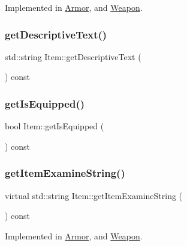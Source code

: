 Implemented in \mbox{\hyperlink{class_armor_a697e23862a5a6bb32fc5b1b143d61f58}{Armor}}, and \mbox{\hyperlink{class_weapon_af7fda0b6e0d4ce8f25e2b0e4ad5fd94d}{Weapon}}.

\mbox{\label{class_item_acc7555345dbfa5a079622fb3eec6f5b7}} 
\subsubsection{\texorpdfstring{get\+Descriptive\+Text()}{getDescriptiveText()}}
{\footnotesize\ttfamily std\+::string Item\+::get\+Descriptive\+Text (\begin{DoxyParamCaption}{ }\end{DoxyParamCaption}) const}

\mbox{\label{class_item_a9839c6a1b61487bbbe15b7ebba07de34}} 
\subsubsection{\texorpdfstring{get\+Is\+Equipped()}{getIsEquipped()}}
{\footnotesize\ttfamily bool Item\+::get\+Is\+Equipped (\begin{DoxyParamCaption}{ }\end{DoxyParamCaption}) const}

\mbox{\label{class_item_a00e06647e1adeb62f2d95044476126ac}} 
\subsubsection{\texorpdfstring{get\+Item\+Examine\+String()}{getItemExamineString()}}
{\footnotesize\ttfamily virtual std\+::string Item\+::get\+Item\+Examine\+String (\begin{DoxyParamCaption}{ }\end{DoxyParamCaption}) const\hspace{0.3cm}{\ttfamily [pure virtual]}}



Implemented in \mbox{\hyperlink{class_armor_a731bb4d1fe53070f30a336db82fada2c}{Armor}}, and \mbox{\hyperlink{class_weapon_aa52cecf0a3c34aba70a6425c36d40afa}{Weapon}}.

